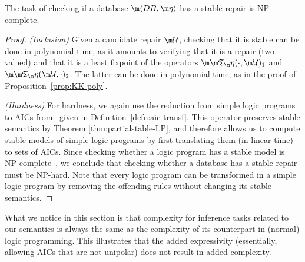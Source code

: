 \begin{proposition}\label{prop:stable-complexity}
  The task of checking if a database $\fulldb$ has a stable repair is NP-complete.
\end{proposition}
\begin{proof}
  \emph{(Inclusion)} Given a candidate repair $\UU$, checking that it is stable can be done in polynomial time, as it amounts to verifying that it is a repair (two-valued) and that it is a least fixpoint of the operators $\Ap(\cdot, \UU)_1$ and $\Ap(\UU,\cdot)_2$.
  The latter can be done in polynomial time, as in the proof of Proposition~\ref{prop:KK-poly}.

  \emph{(Hardness)} For hardness, we again use the reduction from simple logic programs to AICs from~\cite{tplp/CaropreseT11} given in Definition~\ref{defn:aic-transf}.
  This operator preserves stable semantics by Theorem \ref{thm:partialstable-LP}, and therefore allows us to compute stable models of simple logic programs by first translating them (in linear time) to sets of AICs.
  Since checking whether a logic program has a stable model is NP-complete~\cite{tcs/BidoitF91,jacm/MarekT91}, we conclude that checking whether a database has a stable repair must be NP-hard.
  Note that every logic program can be transformed in a simple logic program by removing the offending rules without changing its stable semantics.
\end{proof}




What we notice in this section is that complexity for inference tasks related to our semantics is always the same as the complexity of its counterpart in (normal) logic programming. 
This illustrates that the added expressivity (essentially, allowing AICs that are not unipolar) does not result in added complexity. 

